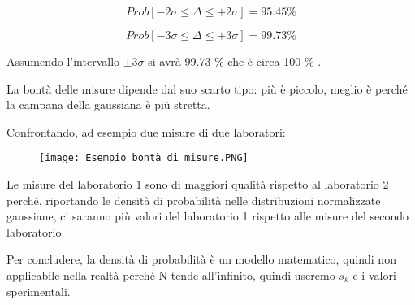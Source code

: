 {
    \Large 
    \begin{equation}
        Prob[- 2 \sigma \leq \Delta \leq + 2 \sigma] = 95.45 \%
    \end{equation}
}

{
    \Large 
    \begin{equation}
        Prob[- 3 \sigma \leq \Delta  \leq + 3 \sigma] = 99.73 \%
    \end{equation}
}


Assumendo l'intervallo $\pm 3 \sigma$ si avrà 99.73 \% che è circa 100 \% . \newline 

La bontà delle misure dipende dal suo scarto tipo: 
più è piccolo, meglio è perché la campana della gaussiana è più stretta. \newline 

Confrontando, ad esempio due misure di due laboratori: 

\begin{figure}[h]
    \centering
    \texttt{[image: Esempio bontà di misure.PNG]}
\end{figure}

Le misure del laboratorio 1 sono di maggiori qualità rispetto al laboratorio 2 perché, 
riportando le densità di probabilità nelle distribuzioni normalizzate gaussiane, 
ci saranno più valori del laboratorio 1 rispetto alle misure del secondo laboratorio. \newline 

Per concludere, la densità di probabilità è un modello matematico, quindi non applicabile nella realtà perché N tende 
all'infinito, quindi useremo $s_k$ e i valori sperimentali. \newline 

\newpage 




